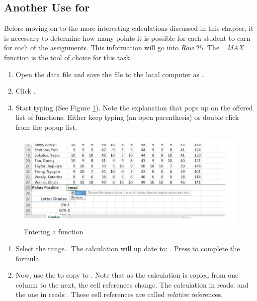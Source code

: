 \subsection{Another Use for }

Before moving on to the more interesting calculations discussed in this chapter, it is necessary to determine how many points it is possible for each student to earn for each of the assignments. This information will go into \textit{Row} $ 25 $. The \textit{=MAX} function is the tool of choice for this task.

\begin{enumerate}
	\item Open the data file  and save the file to the local computer as .
	\item Click .
	\item Start typing  (See Figure \ref{03:fig02}). Note the explanation that pops up on the offered list of functions. Either keep typing \fmtTyping{(} (an open parenthesis) or double click  from the popup list.
\end{enumerate}

\begin{figure}[H]
	\centering
	\includegraphics[width=\maxwidth{.95\linewidth}]{gfx/ch03_fig02}
	\caption{Entering a function}
	\label{03:fig02}
\end{figure}

\begin{enumerate}[resume]
	\item Select the range . The calculation will up date to: . Press  to complete the formula.
	\item Now, use the  to copy  to . Note that as the calculation is copied from one column to the next, the cell references change. The calculation in  reads:  and the one in  reads . These cell references are called \textit{relative} references.
\end{enumerate}

